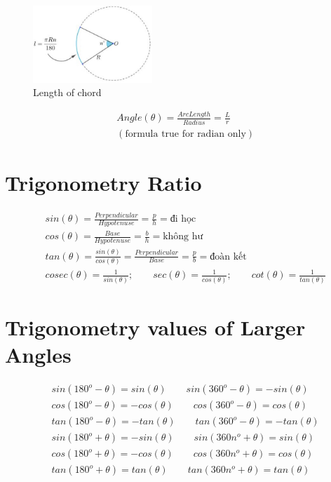 \documentclass{article}
\begin{document}
\begin{figure}[H]
    \centering
    \caption{Length of chord}
    \includegraphics[width=0.4\textwidth]{chord_length.png}
\end{figure}

\begin{align*}
    &Angle(\theta) = \frac{Arc Length}{Radius} = \frac{L}{r} \\
    &(\text{formula true for radian only})
\end{align*}

\section{Trigonometry Ratio}
\begin{align*}
    &sin(\theta) = \frac{Perpendicular}{Hypotenuse} = \frac{p}{h} = \text{đi học} \\
    &cos(\theta) = \frac{Base}{Hypotenuse} = \frac{b}{h} = \text{không hư} \\
    &tan(\theta) = \frac{sin(\theta)}{cos(\theta)} = \frac{Perpendicular}{Base} = \frac{p}{b} = \text{đoàn kết} \\
    &cosec(\theta) = \frac{1}{sin(\theta)}; \qquad
    sec(\theta) = \frac{1}{cos(\theta)}; \qquad
    cot(\theta) = \frac{1}{tan(\theta)}
\end{align*}

\section{Trigonometry values of Larger Angles}
\begin{align*}
    &sin(180^o - \theta) = sin(\theta) \qquad sin(360^o - \theta) = -sin(\theta) \\
    &cos(180^o - \theta) = -cos(\theta) \qquad cos(360^o - \theta) = cos(\theta) \\
    &tan(180^o - \theta) = -tan(\theta) \qquad tan(360^o - \theta) = -tan(\theta) \\
    &sin(180^o + \theta) = -sin(\theta) \qquad sin(360n^o + \theta) = sin(\theta) \\
    &cos(180^o + \theta) = -cos(\theta) \qquad cos(360n^o + \theta) = cos(\theta) \\
    &tan(180^o + \theta) = tan(\theta) \qquad tan(360n^o + \theta) = tan(\theta)
\end{align*}
\end{document}
